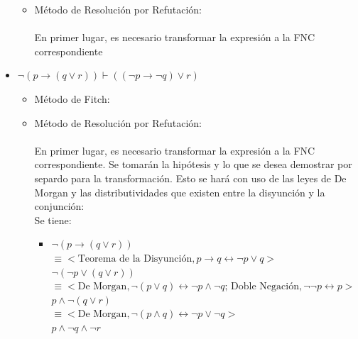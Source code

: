 \documentclass{article}
\begin{document}
\begin{itemize}
\begin{itemize}
	
	
	
	\item M\'etodo de Resoluci\'on por Refutaci\'on:
	
		\paragraph{}
		En primer lugar, es necesario transformar la expresi\'on a la FNC correspondiente 	
	
	
	
		\begin{prooftree}
		\end{prooftree}
	
	\end{itemize}		
	
	\item  $\neg(p \rightarrow (q \lor r)) \vdash ((\neg p \rightarrow \neg q) \lor r)$ 
	
	\begin{itemize}
	
	\item M\'etodo de Fitch:
	
	\item M\'etodo de Resoluci\'on por Refutaci\'on:
		\paragraph{}
		En primer lugar, es necesario transformar la expresi\'on a la FNC correspondiente. Se tomar\'an la hip\'otesis y lo que se desea demostrar por separdo para la transformaci\'on. Esto se har\'a con uso de las leyes de De Morgan y las distributividades que existen entre la disyunci\'on y la conjunci\'on: \\
		
		Se tiene:
		
		\begin{itemize}

		\item $\neg(p \rightarrow (q \lor r))$ \\
				$\equiv < \text{Teorema de la Disyunci\'on},  
					p \rightarrow q \leftrightarrow \neg p \lor q >$ \\
				$ \neg( \neg p \lor (q \lor r))$ \\
				$ \equiv <\text{De Morgan}, 
					\neg(p \lor q) \leftrightarrow \neg p \land \neg q \text {; Doble Negaci\'on}, \neg \neg p \leftrightarrow p>  $ \\
				$ p \land \neg ( q \lor r)$ \\
				$ \equiv <\text{De Morgan}, 
					\neg(p \land q) \leftrightarrow \neg p \lor \neg q>  $ \\
				$ p \land \neg q \land \neg r$
		

\end{itemize}
\end{itemize}
\end{itemize}
\end{document}
